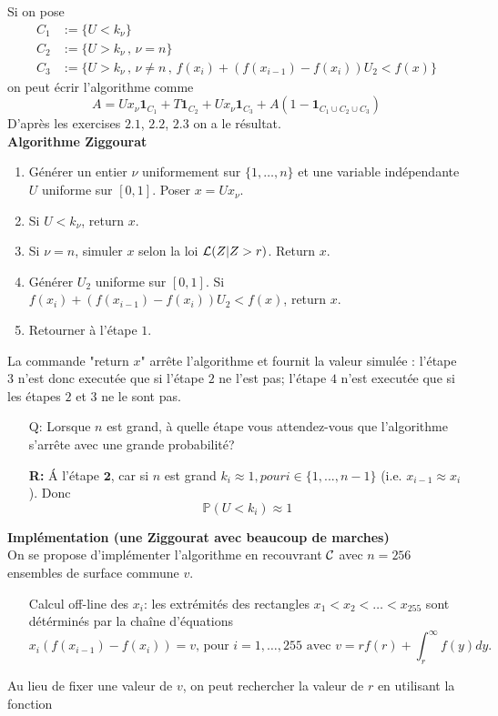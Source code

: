 \documentclass[a4paper]{article}
\begin{document}
Si on pose
\begin{align*}
C_1 &:= \{U<k_{\nu}\}\\
C_2 &:= \{U>k_{\nu}\,,\, \nu=n\}\\
C_3 &:= \{U>k_{\nu}\,,\, \nu\neq n \,,\,f(x_i)+(f(x_{i-1})-f(x_i))U_2<f(x)\}
\end{align*}
on peut \'ecrir l'algorithme comme 
$$A = Ux_{\nu}\mathbf{1}_{C_1}+T\mathbf{1}_{C_2} + Ux_{\nu}\mathbf{1}_{C_3} + A(1-\mathbf{1}_{C_1\cup C_2\cup C_3})$$
D'apr\`es les exercises $\mathbf{2.1}$, $\mathbf{2.2}$, $\mathbf{2.3}$ on a le r\'esultat.
\\\textbf{Algorithme Ziggourat}
\begin{enumerate}
\item G\'en\'erer un entier $\nu$ uniformement sur $\{1,\ldots,n\}$ et une variable ind\'ependante $U$ uniforme sur $[0,1]$. Poser $x = Ux_{\nu}$.
\item Si $U<k_{\nu}$, return $x$.
\item Si $\nu = n$, simuler $x$ selon la loi ${\cal L}(Z|Z>r)$. Return $x$.
\item G\'en\'erer $U_2$ uniforme sur $[0,1]$. Si $f(x_i)+(f(x_{i-1})-f(x_i))U_2<f(x)$, return $x$.
\item Retourner \`a l'\'etape $1$.
\end{enumerate}
La commande "return $x$" arr\^ete l'algorithme et fournit la valeur simul\'ee : l'\'etape $3$ n'est donc execut\'ee que si l'\'etape $2$ ne l'est pas; l'\'etape $4$ n'est execut\'ee que si les \'etapes $2$ et $3$ ne le sont pas.
\begin{itemize}
\item[Q:] Lorsque $n$ est grand, \`a quelle \'etape vous attendez-vous que l'algorithme s'arr\^ete avec une grande probabilit\'e?

\textbf{R:} \'A l'\'etape $\mathbf{2}$, car si $n$ est grand $k_i \approx 1, pour i\in\{1,...,n-1\}$ (i.e. $x_{i-1}\approx x_i$). Donc
$$\mathbb{P}(U<k_i)\approx 1$$



\end{itemize}


\textbf{Impl\'ementation (une Ziggourat avec beaucoup de marches)}
\\On se propose d'impl\'ementer l'algorithme en recouvrant ${\cal C}$ avec $n=256$ ensembles de surface commune $v$.
\begin{enumerate}
\item[ ] Calcul off-line des $x_i$: les extr\'emit\'es des rectangles $x_1<x_2<\ldots<x_{255}$ sont d\'et\'ermin\'es par la cha\^ine d'\'equations
$$x_i(f(x_{i-1})-f(x_i)) = v\text{, pour }i=1,\ldots,255\text{ avec }v=rf(r)+\int_r^{\infty}f(y)dy.$$
\end{enumerate}
Au lieu de fixer une valeur de $v$, on peut rechercher la valeur de $r$ en utilisant la fonction
\end{document}
